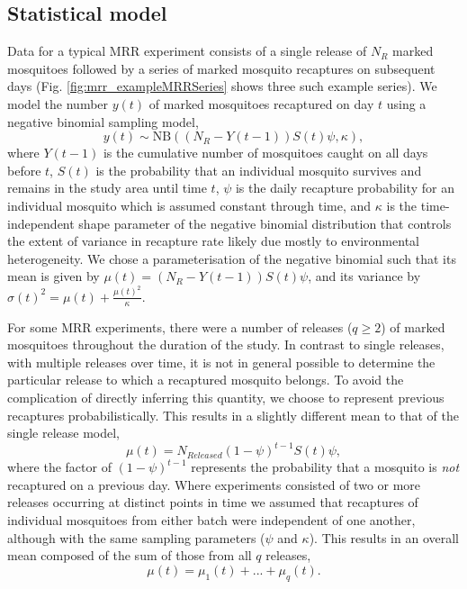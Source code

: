 \documentclass[12pt]{article}
\begin{document}
\subsection{Statistical model}\label{sec:mrr_statistical}
Data for a typical MRR experiment consists of a single release of $N_{R}$ marked mosquitoes followed by a series of marked mosquito recaptures on subsequent days (Fig. \ref{fig:mrr_exampleMRRSeries} shows three such example series). We model the number $y(t)$ of marked mosquitoes recaptured on day $t$ using a negative binomial sampling model,
%
\begin{equation}\label{eq:NB}
y(t) \sim \text{NB}\left((N_{R} - Y(t-1)) S(t) \psi, \kappa\right),
\end{equation}
%
where $Y(t-1)$ is the cumulative number of mosquitoes caught on all days before $t$, $S(t)$ is the probability that an individual mosquito survives and remains in the study area until time $t$, $\psi$ is the daily recapture probability for an individual mosquito which is assumed constant through time, and $\kappa$ is the time-independent shape parameter of the negative binomial distribution that controls the extent of variance in recapture rate likely due mostly to environmental heterogeneity. We chose a parameterisation of the negative binomial such that its mean is given by $\mu(t) = (N_{R} - Y(t-1)) S(t) \psi$, and its variance by $\sigma(t)^2 = \mu(t) + \frac{\mu(t)^2}{\kappa}$. 

For some MRR experiments, there were a number of releases ($q\geq 2$) of marked mosquitoes throughout the duration of the study. In contrast to single releases, with multiple releases over time, it is not in general possible to determine the particular release to which a recaptured mosquito belongs. To avoid the complication of directly inferring this quantity, we choose to represent previous recaptures probabilistically. This results in a slightly different mean to that of the single release model,
%
\begin{equation}
\mu(t) = N_{Released}(1-\psi)^{t-1} S(t) \psi,
\end{equation}
%
where the factor of $(1-\psi)^{t-1}$ represents the probability that a mosquito is \textit{not} recaptured on a previous day. Where experiments consisted of two or more releases occurring at distinct points in time we assumed that recaptures of individual mosquitoes from either batch were independent of one another, although with the same sampling parameters ($\psi$ and $\kappa$). This results in an overall mean composed of the sum of those from all $q$ releases,
%
\begin{equation}
\mu(t) = \mu_1(t) + ... + \mu_q(t).
\end{equation}
%
\end{document}
